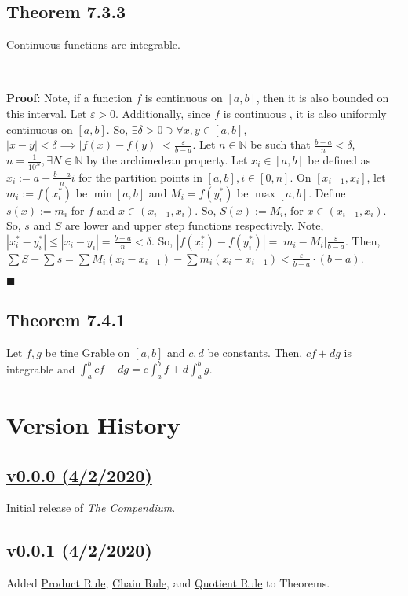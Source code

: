\documentclass[11pt]{book}
\newcommand{\N}{\mathbb{N}}
\newcommand{\horline}{\noindent\rule{14.25cm}{0.6pt}\\}
\newcommand{\QED}{\begin{flushright}$\blacksquare$\end{flushright}}
\begin{document}
		\subsection{Theorem 7.3.3}					
		\label{subsec:theor733}
			\begin{theor} Continuous functions are integrable.\hfill\break
				\horline
				\textbf{Proof:} Note, if a function $f$ is continuous on $[a,b]$, then it is also bounded on this interval. Let $\varepsilon > 0$. Additionally, since $f$ is continuous
				 , it is also uniformly continuous on $[a,b]$. So, $\exists \delta > 0 \ni \forall x, y \in [a,b]$, $|x-y| < \delta \implies |f(x) - f(y)| < \frac{\varepsilon}{b-a}$. 
				 Let $n \in \N$ be such that $\frac{b-a}{n} < \delta$, $n = \frac{1}{10^N}, \exists N \in \N$ by the archimedean property. Let $ x_i \in [a,b]$ be defined as 
				 $x_i := a + \frac{b-a}{n}i$ for the partition points in $[a,b], i \in [0,n]$. On $[x_{i-1}, x_i]$, let $m_i := f(x_i^*)$ be $\min[a,b]$ and $M_i = f(y_i^*)$ be 
				 $\max[a,b]$. Define $s(x) := m_i$ for $f$ and $x \in (x_{i-1},x_i)$. So, $S(x) := M_i$, for $x \in (x_{i-1},x_i)$. So, $s$ and $S$ are lower and upper step 
				 functions respectively. Note, $|x_i^* - y_i^*| \leq |x_i - y_i| = \frac{b-a}{n} < \delta$. So, $|f(x_i^*) - f(y_i^*)| = |m_i - M_i|  \frac{\varepsilon}{b-a}$. Then, 
				 $\sum{S} - \sum{s} = \sum{M_i(x_i - x_{i-1})} - \sum{m_i(x_i - x_{i-1})} < \frac{\varepsilon}{b-a} \cdot (b-a)$. 
				 \QED
			\end{theor}

		\subsection{Theorem 7.4.1}
		\label{subsec:theor741}
			\begin{theor}
					Let $f,g$ be tine Grable on $[a,b]$ and $c,d$ be constants. Then, $cf + dg$ is integrable and $\int_a^b{cf + dg} = c\int_a^b{f} + d\int_a^b{g}$.
			\end{theor}

\newpage
\section{Version History}
	\subsection{\href{https://www.overleaf.com/read/gyqrjdfnjyvb}{v0.0.0 (4/2/2020)}}
		Initial release of \emph{The Compendium}. 		
	\subsection{v0.0.1 (4/2/2020)}
		Added \hyperref[subsec:productrule]{Product Rule}, \hyperref[subsec:chainrule]{Chain Rule}, and \hyperref[subsec:quotientrule]{Quotient Rule} to Theorems.
\end{document}
